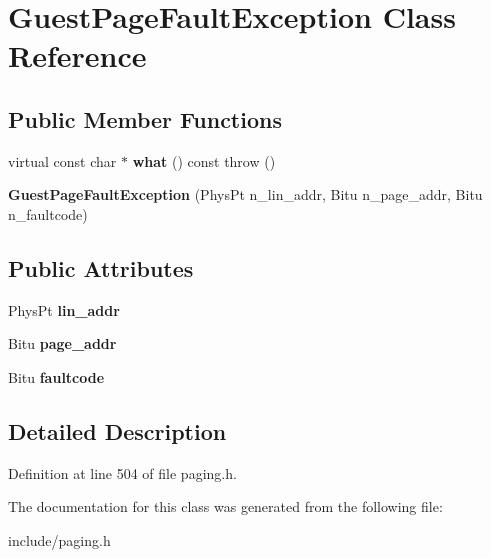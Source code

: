 \hypertarget{classGuestPageFaultException}{\section{Guest\-Page\-Fault\-Exception Class Reference}
\label{classGuestPageFaultException}
}
\subsection*{Public Member Functions}
\begin{DoxyCompactItemize}
\item 
\hypertarget{classGuestPageFaultException_a1bebaa50f525dd7556d947e96936b3b9}{virtual const char $\ast$ {\bfseries what} () const   throw ()}\label{classGuestPageFaultException_a1bebaa50f525dd7556d947e96936b3b9}

\item 
\hypertarget{classGuestPageFaultException_a2e8fc056edd06f2f4d466a2f2a09af5f}{{\bfseries Guest\-Page\-Fault\-Exception} (Phys\-Pt n\-\_\-lin\-\_\-addr, Bitu n\-\_\-page\-\_\-addr, Bitu n\-\_\-faultcode)}\label{classGuestPageFaultException_a2e8fc056edd06f2f4d466a2f2a09af5f}

\end{DoxyCompactItemize}
\subsection*{Public Attributes}
\begin{DoxyCompactItemize}
\item 
\hypertarget{classGuestPageFaultException_ab1a92143880433da862396ee81c28328}{Phys\-Pt {\bfseries lin\-\_\-addr}}\label{classGuestPageFaultException_ab1a92143880433da862396ee81c28328}

\item 
\hypertarget{classGuestPageFaultException_ab38013309d0af12e5c9def2b0c8ff77a}{Bitu {\bfseries page\-\_\-addr}}\label{classGuestPageFaultException_ab38013309d0af12e5c9def2b0c8ff77a}

\item 
\hypertarget{classGuestPageFaultException_a49906c9d52468c91f0b6218de7f21cc1}{Bitu {\bfseries faultcode}}\label{classGuestPageFaultException_a49906c9d52468c91f0b6218de7f21cc1}

\end{DoxyCompactItemize}


\subsection{Detailed Description}


Definition at line 504 of file paging.\-h.



The documentation for this class was generated from the following file\-:\begin{DoxyCompactItemize}
\item 
include/paging.\-h\end{DoxyCompactItemize}

